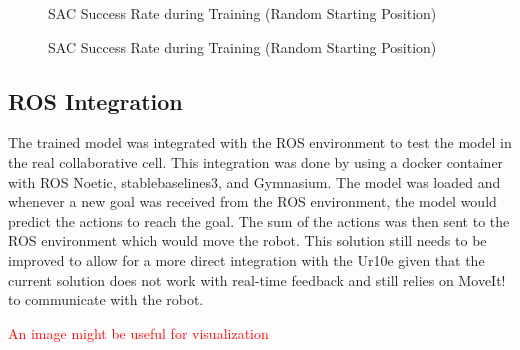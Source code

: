 \begin{figure}[H]%
    \centering
    {\fontsize{8}{11}\selectfont}
    \caption{SAC Success Rate during Training (Random Starting Position)}
    \label{fig:reward_rp}
\end{figure}

\begin{figure}[H]%
    \centering
    {\fontsize{8}{11}\selectfont}
    \caption{SAC Success Rate during Training (Random Starting Position)}
    \label{fig:success_rate_rp}
\end{figure}

\subsection{ROS Integration}

The trained model was integrated with the ROS environment to test the model in the real collaborative cell. This integration was done by using a docker container with ROS Noetic, stablebaselines3, and Gymnasium. The model was loaded and whenever a new goal was received from the ROS environment, the model would predict the actions to reach the goal. The sum of the actions was then sent to the ROS environment which would move the robot. This solution still needs to be improved to allow for a more direct integration with the Ur10e given that the current solution does not work with real-time feedback and still relies on MoveIt! to communicate with the robot.

\textcolor{red}{An image might be useful for visualization}